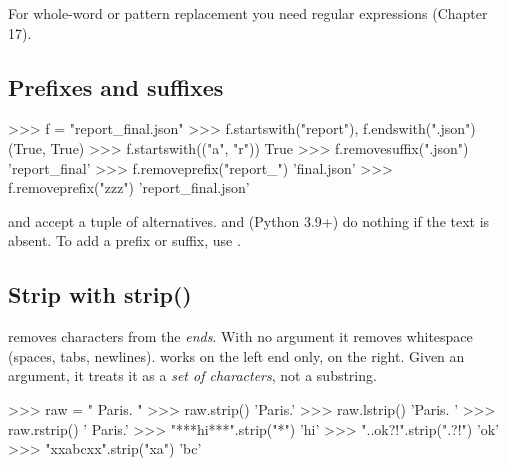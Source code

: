 For whole-word or pattern replacement you need regular expressions (Chapter 17).

\subsection{Prefixes and suffixes}

\begin{pycode}
>>> f = "report_final.json"
>>> f.startswith("report"), f.endswith(".json")
(True, True)
>>> f.startswith(("a", "r"))
True
>>> f.removesuffix(".json")
'report_final'
>>> f.removeprefix("report_")
'final.json'
>>> f.removeprefix("zzz")
'report_final.json'
\end{pycode}

 and  accept a tuple of alternatives.  and 
(Python 3.9+) do nothing if the text is absent. To add a prefix or suffix, use \code{+}.

\subsection{Strip with strip()}

 removes characters from the \emph{ends}. With no argument it removes whitespace
(spaces, tabs, newlines).  works on the left end only,  on the right.
Given an argument, it treats it as a \emph{set of characters}, not a substring.

\begin{center}
\end{center}

\begin{pycode}
>>> raw = "  \n  Paris.  \n"
>>> raw.strip()
'Paris.'
>>> raw.lstrip()
'Paris.  \n'
>>> raw.rstrip()
'  \n  Paris.'
>>> "***hi***".strip("*")
'hi'
>>> "..ok?!".strip(".?!")
'ok'
>>> "xxabcxx".strip("xa")
'bc'
\end{pycode}

